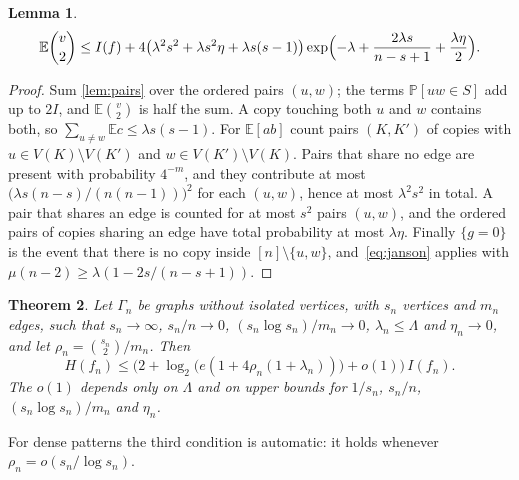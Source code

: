 \documentclass[11pt]{amsart}
\newtheorem{theorem}{Theorem}[section]
\newtheorem{lemma}[theorem]{Lemma}
\theoremstyle{remark}
\newcommand{\E}{\mathbb{E}}
\renewcommand{\Pr}{\mathbb{P}}
\begin{document}
\begin{lemma}\label{lem:pairsum}
\[
\E\binom v2\le I(f)+4\bigl(\lambda^2s^2+\lambda s^2\eta+\lambda s(s-1)\bigr)\exp\Bigl(-\lambda+\frac{2\lambda s}{n-s+1}+\frac{\lambda\eta}2\Bigr).
\]
\end{lemma}

\begin{proof}
Sum \cref{lem:pairs} over the ordered pairs $(u,w)$; the terms $\Pr[uw\in S]$ add up to $2I$, and $\E\binom v2$ is half
the sum. A copy touching both $u$ and $w$ contains both, so $\sum_{u\ne w}\E c\le\lambda s(s-1)$. For $\E[ab]$ count
pairs $(K,K')$ of copies with $u\in V(K)\setminus V(K')$ and $w\in V(K')\setminus V(K)$. Pairs that share no edge are
present with probability $4^{-m}$, and they contribute at most
$\bigl(\lambda s(n-s)/(n(n-1))\bigr)^2$ for each $(u,w)$, hence at most $\lambda^2s^2$ in total. A pair that shares an
edge is counted for at most $s^2$ pairs $(u,w)$, and the ordered pairs of copies sharing an edge have total
probability at most $\lambda\eta$. Finally $\{g=0\}$ is the event that there is no copy inside $[n]\setminus\{u,w\}$,
and~\eqref{eq:janson} applies with $\mu(n-2)\ge\lambda(1-2s/(n-s+1))$.
\end{proof}

\begin{theorem}\label{thm:copies}
Let $\Gamma_n$ be graphs without isolated vertices, with $s_n$ vertices and $m_n$ edges, such that $s_n\to\infty$,
$s_n/n\to0$, $(s_n\log s_n)/m_n\to0$, $\lambda_n\le\Lambda$ and $\eta_n\to0$, and let $\rho_n=\binom{s_n}2/m_n$. Then
\[
H(f_n)\le\bigl(2+\log_2\bigl(e(1+4\rho_n(1+\lambda_n))\bigr)+o(1)\bigr)\,I(f_n).
\]
The $o(1)$ depends only on $\Lambda$ and on upper bounds for $1/s_n$, $s_n/n$, $(s_n\log s_n)/m_n$ and $\eta_n$.
\end{theorem}

For dense patterns the third condition is automatic: it holds whenever $\rho_n=o(s_n/\log s_n)$.
\end{document}
